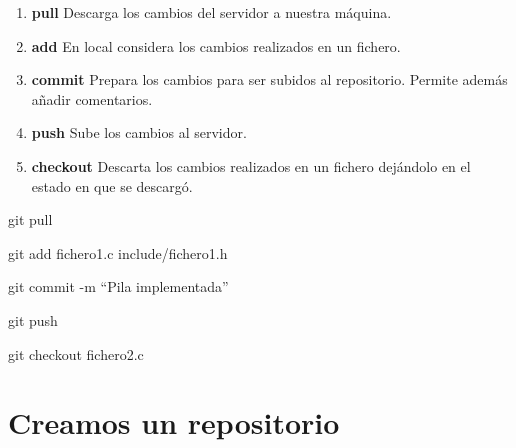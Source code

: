 \documentclass[10pt,compress,usetitleprogressbar,aspectratio=1610,mathserif,notes]{beamer}
\begin{document}
\begin{frame}
\begin{enumerate}
\item \textbf{pull} Descarga los cambios del servidor a nuestra máquina.
\item \textbf{add} En local considera los cambios realizados en un fichero.
\item \textbf{commit} Prepara los cambios para ser subidos al repositorio. Permite además añadir comentarios.
\item \textbf{push} Sube los cambios al servidor.
\item \textbf{checkout} Descarta los cambios realizados en un fichero dejándolo en el estado en que se descargó.
\end{enumerate}

\begin{example}
git pull

git add fichero1.c include/fichero1.h

git commit -m ``Pila implementada''

git push

git checkout fichero2.c
\end{example}

\end{frame}

\section{Creamos un repositorio}
\end{document}
